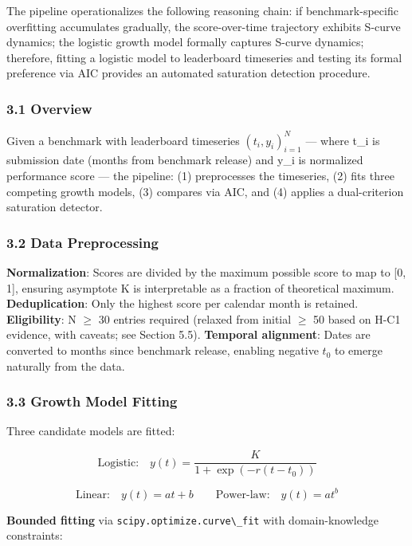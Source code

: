 
The pipeline operationalizes the following reasoning chain: if benchmark-specific overfitting accumulates gradually, the score-over-time trajectory exhibits S-curve dynamics; the logistic growth model formally captures S-curve dynamics; therefore, fitting a logistic model to leaderboard timeseries and testing its formal preference via AIC provides an automated saturation detection procedure.

\subsubsection{3.1 Overview}

Given a benchmark with leaderboard timeseries ${(t_i, y_i)}_{i=1}^{N}$ --- where t\_i is submission date (months from benchmark release) and y\_i is normalized performance score --- the pipeline: (1) preprocesses the timeseries, (2) fits three competing growth models, (3) compares via AIC, and (4) applies a dual-criterion saturation detector.

\subsubsection{3.2 Data Preprocessing}

\textbf{Normalization}: Scores are divided by the maximum possible score to map to [0, 1], ensuring asymptote K is interpretable as a fraction of theoretical maximum. \textbf{Deduplication}: Only the highest score per calendar month is retained. \textbf{Eligibility}: N $\geq$ 30 entries required (relaxed from initial $\geq$ 50 based on H-C1 evidence, with caveats; see Section 5.5). \textbf{Temporal alignment}: Dates are converted to months since benchmark release, enabling negative $t_0$ to emerge naturally from the data.

\subsubsection{3.3 Growth Model Fitting}

Three candidate models are fitted:

$$\text{Logistic:} \quad y(t) = \frac{K}{1 + \exp(-r(t - t_0))}$$

$$\text{Linear:} \quad y(t) = at + b \qquad \text{Power-law:} \quad y(t) = at^b$$

\textbf{Bounded fitting} via \texttt{scipy.optimize.curve\textbackslash \_fit} with domain-knowledge constraints:

\begin{table}[htbp]
\centering
{}
\end{table}

